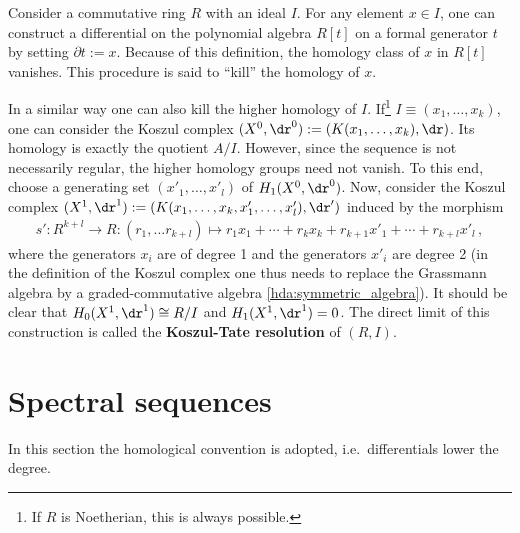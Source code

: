     \begin{property}\label{homalg:koszul_tate_resolution}
        Consider a commutative ring $R$ with an ideal $I$. For any element $x\in I$, one can construct a differential on the polynomial algebra $R[t]$ on a formal generator $t$ by setting $\partial t:=x$. Because of this definition, the homology class of $x$ in $R[t]$ vanishes. This procedure is said to ``kill'' the homology of $x$.

        In a similar way one can also kill the higher homology of $I$. If\footnote{If $R$ is Noetherian, this is always possible.} $I\equiv(x_1,\ldots,x_k)$, one can consider the Koszul complex $(X^0,\dr^0):=(K(x_1,\ldots,x_k),\dr)$. Its homology is exactly the quotient $A/I$. However, since the sequence is not necessarily regular, the higher homology groups need not vanish. To this end, choose a generating set $(x'_1,\ldots,x'_l)$ of $H_1(X^0,\dr^0)$. Now, consider the Koszul complex $(X^1,\dr^1):=(K(x_1,\ldots,x_k,x'_1,\ldots,x'_l),\dr')$ induced by the morphism
        \begin{gather}
            s':R^{k+l}\rightarrow R:(r_1,\ldots r_{k+l})\mapsto r_1x_1+\cdots+r_kx_k+r_{k+1}x'_1+\cdots+r_{k+l}x'_l\,,
        \end{gather}
        where the generators $x_i$ are of degree 1 and the generators $x'_i$ are degree 2 (in the definition of the Koszul complex one thus needs to replace the Grassmann algebra by a graded-commutative algebra \ref{hda:symmetric_algebra}). It should be clear that $H_0(X^1,\dr^1)\cong R/I$ and $H_1(X^1,\dr^1)=0$. The direct limit of this construction is called the \textbf{Koszul-Tate resolution} of $(R,I)$.
    \end{property}

\section{Spectral sequences}

	In this section the homological convention is adopted, i.e.~differentials lower the degree.


